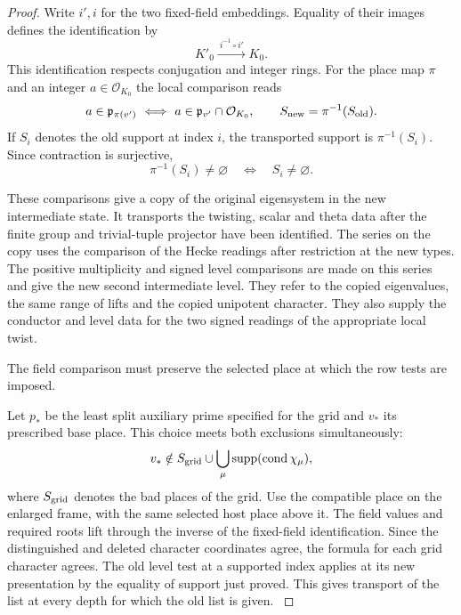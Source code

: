 \begin{proof}
Write \(i',i\) for the two fixed-field embeddings. Equality of their images defines the identification by
\[
 K'_0\xrightarrow{\ i^{-1}\circ i'\ }K_0 .
\] This identification respects
conjugation and integer rings. For the place map \(\pi\) and an
integer \(a\in\mathcal O_{K_0}\) the local comparison reads
\[
 a\in\mathfrak p_{\pi(v')}\ \Longleftrightarrow\
   a\in\mathfrak p_{v'}\cap\mathcal O_{K_0},\qquad
 S_{\rm new}=\pi^{-1}(S_{\rm old}) .
\]
If \(S_i\) denotes the old support at index \(i\), the transported
support is \(\pi^{-1}(S_i)\). Since contraction is surjective,
\[
                \pi^{-1}(S_i)\ne\varnothing
                     \quad\Longleftrightarrow\quad S_i\ne\varnothing .
\] \label{cor:automorphic-realization-58}

These comparisons give a copy of the original
eigensystem in the new intermediate state. It transports
the twisting, scalar and theta data after the finite
group and trivial-tuple projector have been identified.
The series on the copy uses the comparison of the
Hecke readings after restriction at the new types.
The positive multiplicity and signed level comparisons
are made on this series and give the new second
intermediate level. They refer to the copied
eigenvalues, the same range of lifts and the copied
unipotent character. They also supply the conductor
and level data for the two signed readings of the
appropriate local twist.
\label{cor:automorphic-realization-59}

The field comparison must preserve the selected place at which the row tests are imposed.

Let \(p_*\) be the least split auxiliary prime specified for the grid and \(v_*\) its prescribed base place. This choice meets both exclusions simultaneously:
\[
 v_*\notin S_{\rm grid}\cup \bigcup_\mu\operatorname{supp}(\operatorname{cond}\chi_\mu),
\]
where \(S_{\rm grid}\) denotes the bad places of the grid.
Use the compatible
place on the enlarged frame, with the same selected
host place above it. The field values and required
roots lift through the inverse of the fixed-field
identification. Since the distinguished and deleted
character coordinates agree, the formula for each
grid character agrees. The old level test at a supported
index applies at its new presentation by the equality
of support just proved. This gives transport of the list
at every depth for which the old list is given.
\label{cor:automorphic-realization-60}


\end{proof}
